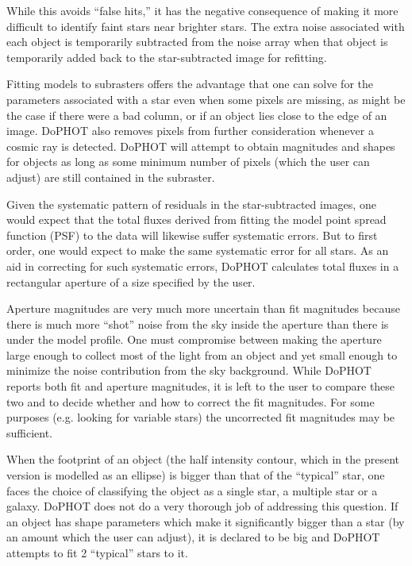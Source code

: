 While this avoids ``false hits,'' it has the negative
consequence of making it more difficult to identify faint
stars near brighter stars.  The extra noise associated with
each object is temporarily subtracted from the noise array
when that object is temporarily added back to the
star-subtracted image for refitting.

Fitting models to subrasters offers the advantage that one
can solve for the parameters associated with a star even
when some pixels are missing, as might be the case if there
were a bad column, or if an object lies close to the edge of
an image.  DoPHOT also removes pixels from further
consideration whenever a cosmic ray is detected.  DoPHOT
will attempt to obtain magnitudes and shapes for objects as
long as some minimum number of pixels (which the user can
adjust) are still contained in the subraster.

Given the systematic pattern of residuals in the
star-subtracted images, one would expect that the total
fluxes derived from fitting the model point spread function
(PSF) to the data will likewise suffer systematic errors.
But to first order, one would expect to make the same
systematic error for all stars.  As an aid in correcting for
such systematic errors, DoPHOT calculates total fluxes in a
rectangular aperture of a size specified by the user.

Aperture magnitudes are very much more uncertain than fit
magnitudes because there is much more ``shot'' noise from
the sky inside the aperture than there is under the model
profile.  One must compromise between making the aperture
large enough  to collect most of the light from an
object and yet small enough to minimize the noise contribution
from the sky background.  While DoPHOT reports both fit and
aperture magnitudes, it is left to the user to compare these
two and to decide whether and how to correct the fit
magnitudes.  For some purposes (e.g. looking for variable
stars) the uncorrected fit magnitudes may be sufficient.

When the footprint of an object (the half intensity contour,
which in the present version is modelled as an ellipse) is
bigger than that of the ``typical'' star, one faces the
choice of classifying the object as a single star, a
multiple star or a galaxy.  DoPHOT does not do a very
thorough job of addressing this question.  If an object has
shape parameters which make it significantly bigger than a
star (by an amount which the user can adjust), it is
declared to be big and DoPHOT attempts to fit 2 ``typical''
stars to it.

